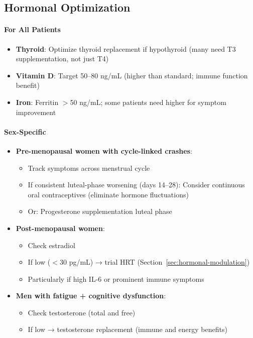 \subsection{Hormonal Optimization}

\paragraph{For All Patients}
\begin{itemize}
    \item \textbf{Thyroid}: Optimize thyroid replacement if hypothyroid (many need T3 supplementation, not just T4)
    \item \textbf{Vitamin D}: Target 50--80 ng/mL (higher than standard; immune function benefit)
    \item \textbf{Iron}: Ferritin $>$50 ng/mL; some patients need higher for symptom improvement
\end{itemize}

\paragraph{Sex-Specific}
\begin{itemize}
    \item \textbf{Pre-menopausal women with cycle-linked crashes}:
    \begin{itemize}
        \item Track symptoms across menstrual cycle
        \item If consistent luteal-phase worsening (days 14--28): Consider continuous oral contraceptives (eliminate hormone fluctuations)
        \item Or: Progesterone supplementation luteal phase
    \end{itemize}

    \item \textbf{Post-menopausal women}:
    \begin{itemize}
        \item Check estradiol
        \item If low ($<$30 pg/mL) → trial HRT (Section~\ref{sec:hormonal-modulation})
        \item Particularly if high IL-6 or prominent immune symptoms
    \end{itemize}

    \item \textbf{Men with fatigue + cognitive dysfunction}:
    \begin{itemize}
        \item Check testosterone (total and free)
        \item If low → testosterone replacement (immune and energy benefits)
    \end{itemize}
\end{itemize}

